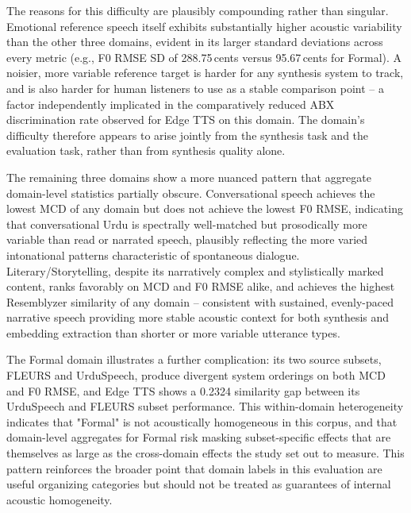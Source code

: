 \documentclass[a4paper,fleqn]{cas-dc}
\begin{document}
    \hspace*{1.2em} The reasons for this difficulty are plausibly compounding rather than singular. Emotional reference speech itself exhibits substantially higher acoustic variability than the other three domains, evident in its larger standard deviations across every metric (e.g., F0 RMSE SD of 288.75\,cents versus 95.67\,cents for Formal). A noisier, more variable reference target is harder for any synthesis system to track, and is also harder for human listeners to use as a stable comparison point -- a factor independently implicated in the comparatively reduced ABX discrimination rate observed for Edge TTS on this domain. The domain's difficulty therefore appears to arise jointly from the synthesis task and the evaluation task, rather than from synthesis quality alone.
    
    \hspace*{1.2em} The remaining three domains show a more nuanced pattern that aggregate domain-level statistics partially obscure. Conversational speech achieves the lowest MCD of any domain but does not achieve the lowest F0 RMSE, indicating that conversational Urdu is spectrally well-matched but
    prosodically more variable than read or narrated speech, plausibly
    reflecting the more varied intonational patterns characteristic of
    spontaneous dialogue. Literary/Storytelling, despite its narratively
    complex and stylistically marked content, ranks favorably on MCD and F0
    RMSE alike, and achieves the highest Resemblyzer similarity of any
    domain -- consistent with sustained, evenly-paced narrative speech
    providing more stable acoustic context for both synthesis and embedding
    extraction than shorter or more variable utterance types.
    
    \hspace*{1.2em} The Formal domain illustrates a further complication: its two source subsets, FLEURS and UrduSpeech, produce divergent system orderings on both MCD and F0 RMSE, and Edge TTS shows a 0.2324 similarity gap between its UrduSpeech and FLEURS subset performance. This within-domain heterogeneity indicates that "Formal" is not acoustically homogeneous in this corpus, and that domain-level aggregates for Formal risk masking subset-specific effects that are themselves as large as the cross-domain effects the study set out to measure. This pattern reinforces the broader point that domain labels in this evaluation are useful organizing categories but should not be treated as guarantees of internal acoustic homogeneity.
    
\end{document}
